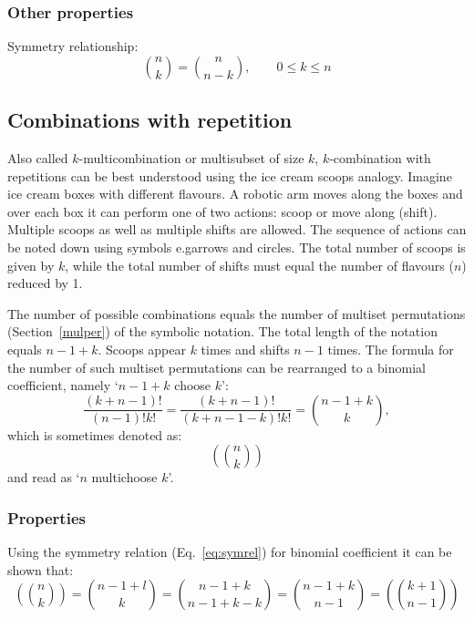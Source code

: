 \documentclass{article}
\makeatletter
\newcommand*{\eg}{e.g\@ifnextchar{.}{}{.\@\xspace}}
\makeatother
\begin{document}
\subsubsection{Other properties}

Symmetry relationship:
%
\begin{equation}
    \label{eq:symrel}
    \binom{n}{k} = \binom{n}{n-k}, \qquad 0 \le k \le n
\end{equation}

\subsection{Combinations with repetition}

Also called $k$\nobreakdash-\hspace{0pt}multicombination or multisubset of size $k$, $k$\nobreakdash-\hspace{0pt}combination with repetitions can be best understood using the ice cream scoops analogy.\cite{mathsisfun}
Imagine ice cream boxes with different flavours.
A robotic arm moves along the boxes and over each box it can perform one of two actions: scoop or move along (shift).
Multiple scoops as well as multiple shifts are allowed.
The sequence of actions can be noted down using symbols \eg arrows and circles.
The total number of scoops is given by $k$, while the total number of shifts must equal the number of flavours ($n$) reduced by 1.

The number of possible combinations equals the number of multiset permutations (Section~\ref{mulper}) of the symbolic notation.
The total length of the notation equals $n-1+k$.
Scoops appear $k$ times and shifts $n-1$ times.
The formula for the number of such multiset permutations can be rearranged to a binomial coefficient, namely `$n-1+k$ choose $k$':
%
\begin{equation}
    \frac{(k+n-1)!}{(n-1)!k!} = \frac{(k+n-1)!}{(k+n-1-k)!k!} = \binom{n-1+k}{k},
\end{equation}
%
which is sometimes denoted as:
%
\begin{equation*}
    \left(\!\!\!\binom{n}{k}\!\!\!\right)
\end{equation*}
%
and read as `$n$ multichoose $k$'.

\subsubsection{Properties}

Using the symmetry relation (Eq.~\ref{eq:symrel}) for binomial coefficient it can be shown that:
%
\begin{equation}
    \left(\!\!\!\binom{n}{k}\!\!\!\right) = \binom{n-1+l}{k} = \binom{n-1+k}{n-1+k-k} = \binom{n-1+k}{n-1} = \left(\!\!\!\binom{k+1}{n-1}\!\!\!\right)
\end{equation}
\end{document}
